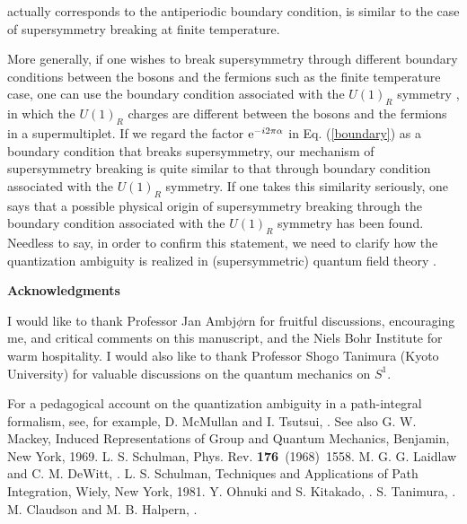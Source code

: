 \documentclass[a4paper,12pt]{article}
\begin{document}
{{actually corresponds to the antiperiodic boundary condition, is similar
to the case of supersymmetry breaking at finite temperature. 
\par  
More generally, if one wishes to break 
supersymmetry through different boundary conditions between the 
bosons and the fermions such as the finite temperature case, one can use 
the boundary
condition associated with the $U(1)_R$ symmetry \cite{scherk}\cite{fayet}
\cite{takenaga}, in which the $U(1)_R$ charges 
are different between the bosons 
and the fermions in a supermultiplet. If we regard the factor
${\rm e}^{-i2\pi\alpha}$ in Eq. (\ref{boundary}) as 
a boundary condition that breaks supersymmetry, our mechanism 
of supersymmetry breaking is quite similar to 
that through boundary condition associated with the $U(1)_R$ symmetry. 
If one takes this similarity seriously, one says that  
a possible physical origin of supersymmetry breaking 
through the boundary condition associated with the $U(1)_R$ symmetry
has been found. Needless to say, in order to confirm this 
statement, we need to 
clarify how the quantization ambiguity is realized in (supersymmetric) 
quantum field theory \cite{zee}.
\par
\vskip 2cm
\begin{center}
{\bf Acknowledgments}
\end{center}
\vspace{10pt}
I would like to thank Professor Jan Ambj{\rm $\phi$}rn for fruitful 
discussions, encouraging me, and critical comments on this manuscript, and 
the Niels Bohr Institute for warm hospitality. I would also like to thank 
Professor Shogo Tanimura (Kyoto University) for valuable discussions
on the quantum mechanics on $S^1$. 
\vskip 2cm
\begin{thebibliography}{99}
 For a pedagogical account on the quantization ambiguity 
in a path-integral formalism, see, for example, D. McMullan and I. Tsutsui, 
. See also G. W. Mackey, Induced Representations of Group 
and Quantum Mechanics, Benjamin, New York, 1969.
 L. S. Schulman, Phys. Rev. {\bf 176}~(1968)~1558.
 M. G. G. Laidlaw and C. M. DeWitt, .
 L. S. Schulman, Techniques and Applications of Path 
Integration, Wiely, New York, 1981. 
 Y. Ohnuki and S. Kitakado, . 
 S. Tanimura, .
 M. Claudson and M. B. Halpern, .

\end{thebibliography}}}
\end{document}

